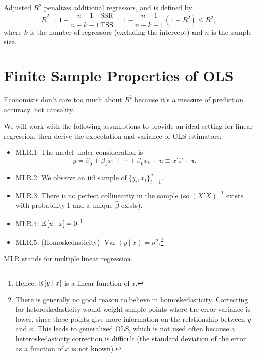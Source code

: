 \begin{definition}[Adjusted $R^2$]
	Adjusted $R^2$ penalizes additional regressors, and is defined by
	\[
		\bar R^2=1-\frac{n-1}{n-k-1}\frac{\text{SSR}}{\text{TSS}}=1-\frac{n-1}{n-k-1}(1-R^2)\le R^2
	,\]
	where $k$ is the number of regressors (excluding the intercept) and $n$ is the sample size.
\end{definition}

\section{Finite Sample Properties of OLS}

Economists don't care too much about $R^2$ because it's a measure of prediction accuracy, not causality.

\begin{remark}
	We will work with the following assumptions to provide an ideal setting for linear regression, then derive the expectation and variance of OLS estimators:
	\begin{itemize}
		\item MLR.1: The model under consideration is
		      \[y=\beta_0+\beta_1x_1+\cdots+\beta_kx_k+u\equiv x'\beta+u.\]
		\item MLR.2: We observe an iid sample of $\{y_i,x_i\}_{i=1}^n$.
		\item MLR.3: There is no perfect collinearity in the sample (so $\left( X'X \right)^{-1}$ exists with probability $1$ and a unique $\hat\beta$ exists).
		\item MLR.4: $\mathbb{E}\left[u\mid x\right]=0$.\footnote{Hence, $\mathbb{E}\left[y \mid x\right] $ is a linear function of $x$.}
		\item MLR.5: (Homoskedasticity) $\operatorname{Var}(y\mid x)=\sigma^2$.\footnote{There is generally no good reason to believe in homoskedasticity. Correcting for heteroskedasticity would weight sample points where the error variance is lower, since these points give more information on the relationship between $y$ and $x$. This leads to generalized OLS, which is not used often because a heteroskedasticity correction is difficult (the standard deviation of the error as a function of $x$ is not known).}
	\end{itemize}
	MLR stands for multiple linear regression.
\end{remark}

